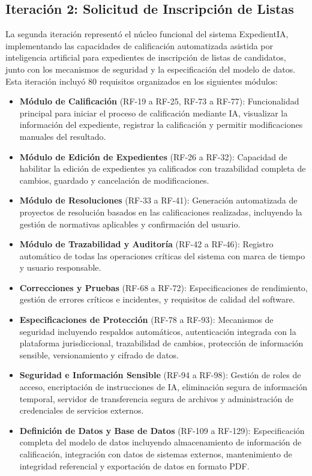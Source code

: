 \documentclass[12pt,a4paper,oneside]{book}
\begin{document}
\subsection{Iteración 2: Solicitud de Inscripción de Listas}
\label{subsec:iteracion2-inscripcion}

La segunda iteración representó el núcleo funcional del sistema ExpedientIA, implementando las capacidades de calificación automatizada asistida por inteligencia artificial para expedientes de inscripción de listas de candidatos, junto con los mecanismos de seguridad y la especificación del modelo de datos. Esta iteración incluyó 80 requisitos organizados en los siguientes módulos:

\begin{itemize}
    \item \textbf{Módulo de Calificación} (RF-19 a RF-25, RF-73 a RF-77): Funcionalidad principal para iniciar el proceso de calificación mediante IA, visualizar la información del expediente, registrar la calificación y permitir modificaciones manuales del resultado.
    \item \textbf{Módulo de Edición de Expedientes} (RF-26 a RF-32): Capacidad de habilitar la edición de expedientes ya calificados con trazabilidad completa de cambios, guardado y cancelación de modificaciones.
    \item \textbf{Módulo de Resoluciones} (RF-33 a RF-41): Generación automatizada de proyectos de resolución basados en las calificaciones realizadas, incluyendo la gestión de normativas aplicables y confirmación del usuario.
    \item \textbf{Módulo de Trazabilidad y Auditoría} (RF-42 a RF-46): Registro automático de todas las operaciones críticas del sistema con marca de tiempo y usuario responsable.
    \item \textbf{Correcciones y Pruebas} (RF-68 a RF-72): Especificaciones de rendimiento, gestión de errores críticos e incidentes, y requisitos de calidad del software.
    \item \textbf{Especificaciones de Protección} (RF-78 a RF-93): Mecanismos de seguridad incluyendo respaldos automáticos, autenticación integrada con la plataforma jurisdiccional, trazabilidad de cambios, protección de información sensible, versionamiento y cifrado de datos.
    \item \textbf{Seguridad e Información Sensible} (RF-94 a RF-98): Gestión de roles de acceso, encriptación de instrucciones de IA, eliminación segura de información temporal, servidor de transferencia segura de archivos y administración de credenciales de servicios externos.
    \item \textbf{Definición de Datos y Base de Datos} (RF-109 a RF-129): Especificación completa del modelo de datos incluyendo almacenamiento de información de calificación, integración con datos de sistemas externos, mantenimiento de integridad referencial y exportación de datos en formato PDF.
\end{itemize}
\end{document}
